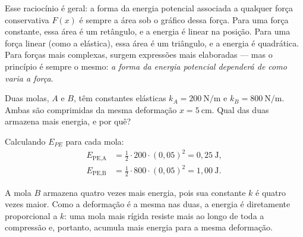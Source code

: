 Esse raciocínio é geral: a forma da energia potencial associada a qualquer força
conservativa $F(x)$ é sempre a área sob o gráfico dessa força. Para uma força constante, essa área é um retângulo, e a energia é linear na posição. Para uma força linear (como a elástica), essa área é um triângulo, e a energia
é quadrática. Para forças mais complexas, surgem expressões mais elaboradas ---
mas o princípio é sempre o mesmo: \textit{a forma da energia potencial dependerá de como varia a força}.


\vspace{0.3cm}

\begin{exemplo}[Nível I]\label{exemplo_energia_potencialelasticaex01}

Duas molas, $A$ e $B$, têm constantes elásticas $k_A = 200\ \text{N/m}$ e
$k_B = 800\ \text{N/m}$. Ambas são comprimidas da mesma deformação $x = 5\ \text{cm}$.
Qual das duas armazena mais energia, e por quê?

\resolucao

Calculando $E_{PE}$ para cada mola:
%
\begin{align*}
    E_\text{PE,A} &= \frac{1}{2} \cdot 200 \cdot (0{,}05)^2 = 0{,}25\ \text{J}, \\
    E_\text{PE,B} &= \frac{1}{2} \cdot 800 \cdot (0{,}05)^2 = 1{,}00\ \text{J}.
\end{align*}

A mola $B$ armazena quatro vezes mais energia, pois sua constante $k$ é quatro
vezes maior. Como a deformação é a mesma nas duas, a energia é diretamente
proporcional a $k$: uma mola mais rígida resiste mais ao longo de toda a
compressão e, portanto, acumula mais energia para a mesma deformação.


\end{exemplo}


\vspace{0.3cm}






